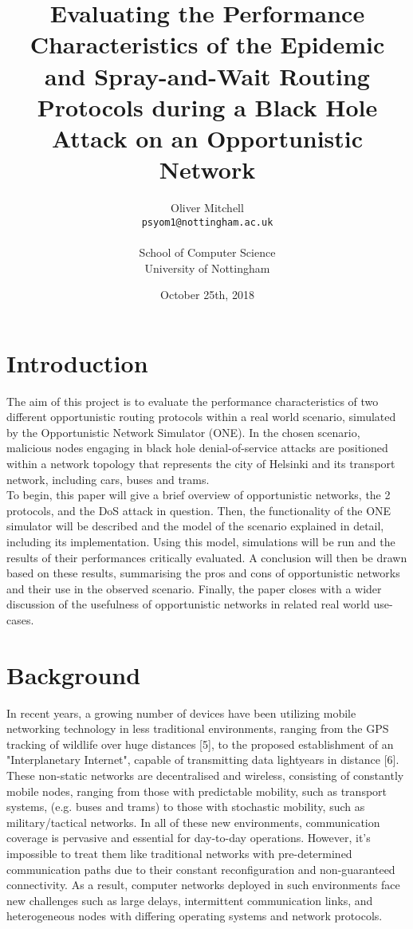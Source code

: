 \documentclass{article}
\title{Evaluating the Performance Characteristics of the Epidemic and Spray-and-Wait Routing Protocols during a Black Hole Attack on an Opportunistic Network }
\author{
  Oliver Mitchell\\
  \texttt{psyom1@nottingham.ac.uk}\\\\
  \textnormal{School of Computer Science}\\
  \textnormal{University of Nottingham}
}
\date{October 25th, 2018}
\begin{document}
\maketitle
 
\tableofcontents
\newpage

\section{Introduction}
The aim of this project is to evaluate the performance characteristics of two different opportunistic routing protocols within a real world scenario, simulated by the Opportunistic Network Simulator (ONE). In the chosen scenario, malicious nodes engaging in black hole denial-of-service attacks are positioned within a network topology that represents the city of Helsinki and its transport network, including cars, buses and trams.\\
\newline
To begin, this paper will give a brief overview of opportunistic networks, the 2 protocols, and the DoS attack in question. Then, the functionality of the ONE simulator will be described and the model of the scenario explained in detail, including its implementation. Using this model, simulations will be run and the results of their performances critically evaluated. A conclusion will then be drawn based on these results, summarising the pros and cons of opportunistic networks and their use in the observed scenario. Finally, the paper closes with a wider discussion of the usefulness of opportunistic networks in related real world use-cases.

\section{Background}
In recent years, a growing number of devices have been utilizing mobile networking technology in less traditional environments, ranging from the GPS tracking of wildlife over huge distances [5], to the proposed establishment of an "Interplanetary Internet", capable of transmitting data lightyears in distance [6]. These non-static networks are decentralised and wireless, consisting of constantly mobile nodes, ranging from those with predictable mobility, such as transport systems, (e.g. buses and trams) to those with stochastic mobility, such as military/tactical networks. In all of these new environments, communication coverage is pervasive and essential for day-to-day operations. However, it's impossible to treat them like traditional networks with pre-determined communication paths due to their constant reconfiguration and non-guaranteed connectivity. As a result, computer networks deployed in such environments face new challenges such as large delays, intermittent communication links, and heterogeneous nodes with differing operating systems and network protocols.
\end{document}
